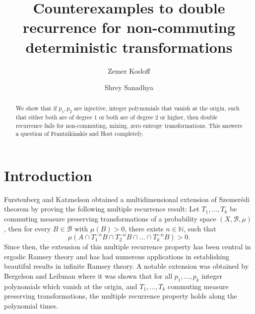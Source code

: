 \documentclass[12pt,reqno]{amsart}
\newcommand{\N}{\mathbb{N}}
\newcommand{\B}{\mathcal{B}}
\theoremstyle{definition}
\begin{document}
\title[Counterexamples to double recurrence]{Counterexamples to double recurrence for non-commuting deterministic transformations}

\author{Zemer Kosloff}
\address{Zemer Kosloff, School of Mathematics, University of Bristol, Fry Building, Woodland Road, Bristol, BS8 1UG, United Kingdom}

\address{Zemer Kosloff, Einstein Institute of Mathematics, Hebrew University of Jerusalem, Edmond J. Safra Campus, Jerusalem, 9190401, Israel.}

\author{Shrey Sanadhya}
\address{Shrey Sanadhya, Einstein Institute of Mathematics, Hebrew University of Jerusalem, Edmond J. Safra Campus, Jerusalem, 9190401, Israel.}



\begin{abstract}
We show that if $p_1,p_2$ are injective, integer polynomials that vanish at the origin, such that either both are of degree $1$ or both are of degree $2$ or higher, then double recurrence fails for non-commuting, mixing, zero entropy transformations. This answers a question of Frantzikinakis and Host completely.
\end{abstract}

\maketitle

\section{Introduction} Furstenberg and Katznelson \cite{Furstenberg_Katznelson_1978}  obtained a multidimensional extension of  Szemerédi theorem by proving the following multiple recurrence result: Let $T_1,\ldots,T_k$ be commuting measure preserving transformations of a probability space $(X,\B,\mu)$, then for every $B \in \B$ with $\mu(B) > 0$, there exists $n\in \N$, such that
\[
\mu \left(A\cap T_1^{-n}B\cap T_2^{-n}B \cap \ldots\cap T_k^{-n}B\right) > 0.
\] 
Since then, the extension of this multiple recurrence property has been central in ergodic Ramsey theory and has had numerous applications in establishing beautiful results in infinite Ramsey theory. A  notable extension was obtained by  Bergelson and Leibman \cite{Bergelson_Leibman_1996} where it was shown that for all $p_1,\ldots,p_k$ integer polynomials which vanish at the origin, and $T_1,\ldots,T_k$ commuting measure preserving transformations, the multiple recurrence property holds along the polynomial times. 
\end{document}
